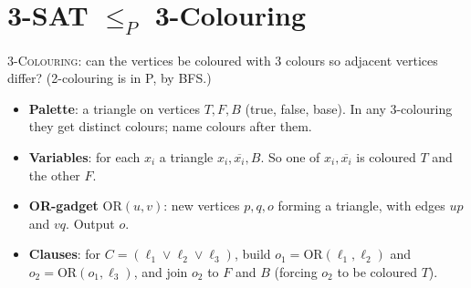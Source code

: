 \section{3-SAT \texorpdfstring{$\le_P$}{<=} 3-Colouring}
\textsc{3-Colouring}: can the vertices be coloured with 3 colours so adjacent vertices differ? (2-colouring is in P, by BFS.)
\begin{itemize}
  \item \textbf{Palette}: a triangle on vertices $T,F,B$ (true, false, base). In any 3-colouring they get distinct colours; name colours after them.
  \item \textbf{Variables}: for each $x_i$ a triangle $x_i,\overline{x_i},B$. So one of $x_i,\overline{x_i}$ is coloured $T$ and the other $F$.
  \item \textbf{OR-gadget} $\mathrm{OR}(u,v)$: new vertices $p,q,o$ forming a triangle, with edges $up$ and $vq$. Output $o$.
  \item \textbf{Clauses}: for $C=(\ell_1\lor\ell_2\lor\ell_3)$, build $o_1=\mathrm{OR}(\ell_1,\ell_2)$ and $o_2=\mathrm{OR}(o_1,\ell_3)$, and join $o_2$ to $F$ and $B$ (forcing $o_2$ to be coloured $T$).
\end{itemize}

